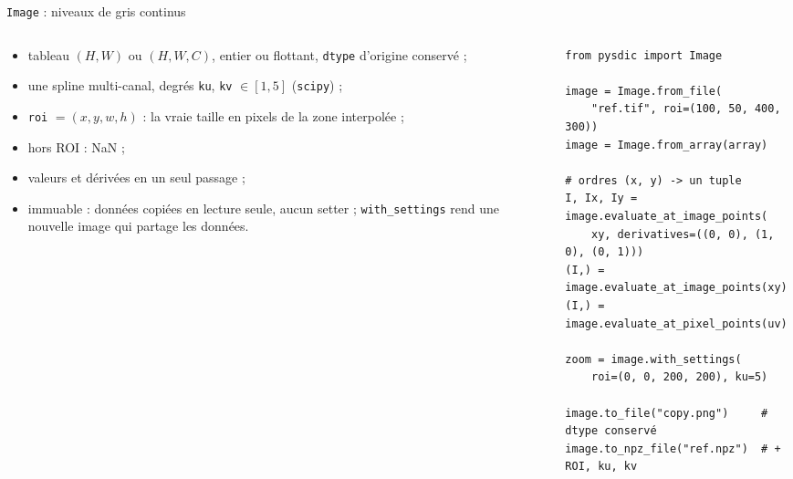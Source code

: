 \documentclass[aspectratio=169,11pt]{beamer}
\newcommand{\code}[1]{\texttt{\small #1}}
\begin{document}
\begin{frame}[fragile]{\texttt{Image} : niveaux de gris continus}
  \begin{columns}[T]
    \begin{column}{0.48\textwidth}\small
      \begin{itemize}
        \item tableau $(H, W)$ ou $(H, W, C)$, entier ou flottant, \code{dtype}
              d'origine conservé ;
        \item une spline \alert{multi-canal}, degrés \code{ku}, \code{kv}
              $\in [1, 5]$ (\texttt{scipy}) ;
        \item \code{roi} $=(x, y, w, h)$ : la vraie taille en pixels de la zone
              interpolée ;
        \item hors ROI : NaN ;
        \item valeurs et dérivées en \alert{un seul passage} ;
        \item \alert{immuable} : données copiées en lecture seule, aucun setter ;
              \code{with\_settings} rend une nouvelle image qui \alert{partage} les
              données.
      \end{itemize}
    \end{column}
    \begin{column}{0.50\textwidth}
\begin{lstlisting}
from pysdic import Image
 
image = Image.from_file(
    "ref.tif", roi=(100, 50, 400, 300))
image = Image.from_array(array)
 
# ordres (x, y) -> un tuple
I, Ix, Iy = image.evaluate_at_image_points(
    xy, derivatives=((0, 0), (1, 0), (0, 1)))
(I,) = image.evaluate_at_image_points(xy)
(I,) = image.evaluate_at_pixel_points(uv)
 
zoom = image.with_settings(
    roi=(0, 0, 200, 200), ku=5)
 
image.to_file("copy.png")     # dtype conservé
image.to_npz_file("ref.npz")  # + ROI, ku, kv
\end{lstlisting}
    \end{column}
  \end{columns}
\end{frame}
 
\end{document}
